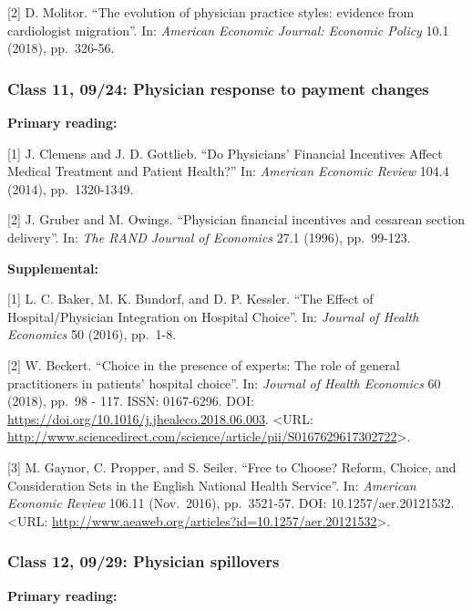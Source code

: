 \documentclass[11pt,]{article}
\begin{document}
{[}2{]} D. Molitor. ``The evolution of physician practice styles:
evidence from cardiologist migration''. In: \emph{American Economic
Journal: Economic Policy} 10.1 (2018), pp.~326-56.

\hypertarget{class-11-0924-physician-response-to-payment-changes}{%
\subsubsection{Class 11, 09/24: Physician response to payment
changes}\label{class-11-0924-physician-response-to-payment-changes}}

\textbf{Primary reading:}

{[}1{]} J. Clemens and J. D. Gottlieb. ``Do Physicians' Financial
Incentives Affect Medical Treatment and Patient Health?'' In:
\emph{American Economic Review} 104.4 (2014), pp.~1320-1349.

{[}2{]} J. Gruber and M. Owings. ``Physician financial incentives and
cesarean section delivery''. In: \emph{The RAND Journal of Economics}
27.1 (1996), pp.~99-123.

\textbf{Supplemental:}

{[}1{]} L. C. Baker, M. K. Bundorf, and D. P. Kessler. ``The Effect of
Hospital/Physician Integration on Hospital Choice''. In: \emph{Journal
of Health Economics} 50 (2016), pp.~1-8.

{[}2{]} W. Beckert. ``Choice in the presence of experts: The role of
general practitioners in patients' hospital choice''. In: \emph{Journal
of Health Economics} 60 (2018), pp.~98 - 117. ISSN: 0167-6296. DOI:
\url{https://doi.org/10.1016/j.jhealeco.2018.06.003}. \textless URL:
\url{http://www.sciencedirect.com/science/article/pii/S0167629617302722}\textgreater.

{[}3{]} M. Gaynor, C. Propper, and S. Seiler. ``Free to Choose? Reform,
Choice, and Consideration Sets in the English National Health Service''.
In: \emph{American Economic Review} 106.11 (Nov.~2016), pp.~3521-57.
DOI: 10.1257/aer.20121532. \textless URL:
\url{http://www.aeaweb.org/articles?id=10.1257/aer.20121532}\textgreater.

\hypertarget{class-12-0929-physician-spillovers}{%
\subsubsection{Class 12, 09/29: Physician
spillovers}\label{class-12-0929-physician-spillovers}}

\textbf{Primary reading:}
\end{document}
